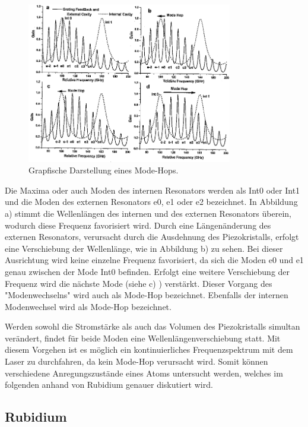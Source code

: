 \begin{figure}[H]
\centering
\includegraphics[width=0.8\textwidth]{ressources/Mode_Hop.png}
\caption{Grapfische Darstellung eines Mode-Hops. \cite{skript}}
\label{theo5}
\end{figure}

Die Maxima oder auch Moden des internen Resonators werden als Int0 oder Int1 und die Moden des externen Resonators e0, e1 oder e2 bezeichnet. In Abbildung a) stimmt die Wellenlängen des internen und des externen Resonators überein, wodurch diese Frequenz favorisiert wird. Durch eine Längenänderung des externen Resonators, verursacht durch die Ausdehnung des Piezokristalls, erfolgt eine Verschiebung der Wellenlänge, wie in Abbildung b) zu sehen. Bei dieser Ausrichtung wird keine einzelne Frequenz favorisiert, da sich die Moden e0 und e1 genau zwischen der Mode Int0 befinden. Erfolgt eine weitere Verschiebung der Frequenz wird die nächste Mode (siehe c) ) verstärkt. Dieser Vorgang des "Modenwechselns" wird auch als Mode-Hop bezeichnet. Ebenfalls der internen Modenwechsel wird als Mode-Hop bezeichnet.

Werden sowohl die Stromstärke als auch das Volumen des Piezokristalls simultan verändert, findet für beide Moden eine Wellenlängenverschiebung statt. Mit diesem Vorgehen ist es möglich ein kontinuierliches Frequenzspektrum mit dem Laser zu durchfahren, da kein Mode-Hop verursacht wird. Somit können verschiedene Anregungszustände eines Atoms untersucht werden, welches im folgenden anhand von Rubidium genauer diskutiert wird.

\subsection{Rubidium}

